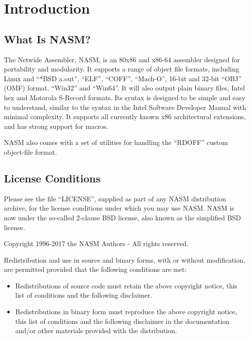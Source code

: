 \chapter{Introduction}

\section{What Is NASM?}

The Netwide Assembler, NASM, is an 80x86 and x86-64 assembler designed
for portability and modularity. It supports a range of object file
formats, including Linux and ``*BSD a.out'', ``ELF'', ``COFF'',
``Mach-O'', 16-bit and 32-bit ``OBJ'' (OMF) format, ``Win32'' and
``Win64''. It will also output plain binary files, Intel hex and
Motorola S-Record formats. Its syntax is designed to be simple and
easy to understand, similar to the syntax in the Intel Software
Developer Manual with minimal complexity. It supports all currently
known x86 architectural extensions, and has strong support for macros.

NASM also comes with a set of utilities for handling the ``RDOFF''
custom object-file format.

\section{License Conditions}

Please see the file  ``LICENSE'', supplied as part
of any NASM distribution archive, for the license conditions under
which you may use NASM.  NASM is now under the so-called 2-clause
BSD license, also known as the simplified BSD license.

Copyright 1996-2017 the NASM Authors - All rights reserved.

Redistribution and use in source and binary forms, with or without
modification, are permitted provided that the following conditions are
met:

\begin{itemize}
	\item{Redistributions of source code must retain the above copyright
	notice, this list of conditions and the following disclaimer.}

	\item{Redistributions in binary form must reproduce the above copyright
	notice, this list of conditions and the following disclaimer in the
	documentation and/or other materials provided with the distribution.}
\end{itemize}

